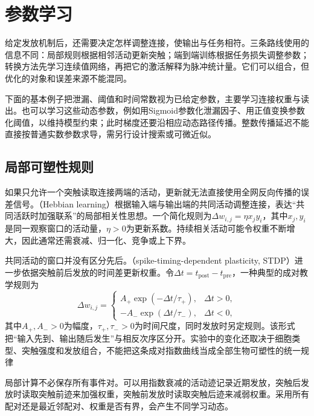 \section{参数学习}
\label{sec:snn-learning}

给定发放机制后，还需要决定怎样调整连接，使输出与任务相符。三条路线使用的信息不同：局部规则根据相邻活动更新突触；端到端训练根据任务损失调整参数；转换方法先学习连续值网络，再把它的激活解释为脉冲统计量。它们可以组合，但优化的对象和误差来源不能混同。

下面的基本例子把泄漏、阈值和时间常数视为已给定参数，主要学习连接权重与读出。也可以学习这些动态参数，例如用Sigmoid参数化泄漏因子、用正值变换参数化阈值，以维持模型约束；此时梯度还要沿相应动态路径传播。整数传播延迟不能直接按普通实数参数求导，需另行设计搜索或可微近似。

\subsection{局部可塑性规则}
\label{sec:snn-plasticity}

如果只允许一个突触读取连接两端的活动，更新就无法直接使用全网反向传播的误差信号。（Hebbian learning）根据输入端与输出端的共同活动调整连接，表达“共同活跃时加强联系”的局部相关性思想。一个简化规则为$\Delta w_{i,j}=\eta x_jy_i$，其中$x_j,y_i$是同一观察窗口的活动量，$\eta>0$为更新系数。持续相关活动可能令权重不断增大，因此通常还需衰减、归一化、竞争或上下界。

共同活动的窗口并没有区分先后。（spike-timing-dependent plasticity, STDP）进一步依据突触前后发放的时间差更新权重。令$\Delta t=t_{\mathrm{post}}-t_{\mathrm{pre}}$，一种典型的成对教学规则为
\begin{equation}
  \Delta w_{i,j}=\begin{cases}
    A_+\exp(-\Delta t/\tau_+),&\Delta t>0,\\
    -A_-\exp(\Delta t/\tau_-),&\Delta t<0,
  \end{cases}
  \label{eq:snn-stdp}
\end{equation}
其中$A_+,A_->0$为幅度，$\tau_+,\tau_->0$为时间尺度，同时发放时另定规则。该形式把“输入先到、输出随后发生”与相反次序区分开。实验中的变化还取决于细胞类型、突触强度和发放组合，不能把这条成对指数曲线当成全部生物可塑性的统一规律

局部计算不必保存所有事件对。可以用指数衰减的活动迹记录近期发放，突触后发放时读取突触前迹来加强权重，突触前发放时读取突触后迹来减弱权重。采用所有配对还是最近邻配对、权重是否有界，会产生不同学习动态。

